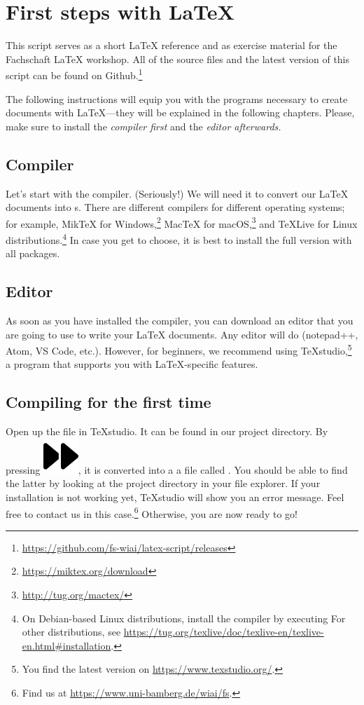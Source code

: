 \newpage
{}
\pagecolor{latexblue}

\chapter*{First steps with \LaTeX}

This script serves as a short \LaTeX{} reference and as exercise material for the Fachschaft  \LaTeX{} workshop.
All of the source files and the latest version of this script can be found on Github.\footnote{\url{https://github.com/fs-wiai/latex-script/releases}}

The following instructions will equip you with the programs necessary to create documents with \LaTeX{}---they will be explained in the following chapters.
Please, make sure to install the \emph{compiler first} and the \emph{editor afterwards}\textit{.}

\section*{Compiler}
Let’s start with the compiler.
(Seriously!)
We will need it to convert our \LaTeX{} documents into s.
There are different compilers for different operating systems;
for example, MikTeX for Windows,\footnote{\url{https://miktex.org/download}} Mac\TeX{} for macOS,\footnote{\url{http://tug.org/mactex/}} and \TeX{}Live for Linux distributions.\footnote{On Debian-based Linux distributions, install the compiler by executing 
For other distributions, see \url{https://tug.org/texlive/doc/texlive-en/texlive-en.html\#installation}.}
In case you get to choose, it is best to install the full version with all packages.

\section*{Editor}
As soon as you have installed the compiler, you can download an editor that you are going to use to write your \LaTeX{} documents.
Any editor will do (notepad++, Atom, VS Code, etc.).
However, for beginners, we recommend using \TeX{}studio,\footnote{You find the latest version on \url{https://www.texstudio.org/}.} a program that supports you with \LaTeX-specific features.

\section*{Compiling for the first time}
Open up the file  in \TeX{}studio. 
It can be found in our project directory.
By pressing \includegraphics[width=.8em]{graphics/faForward.png}, it is converted into a a file called .
You should be able to find the latter by looking at the project directory in your file explorer.
If your installation is not working yet, \TeX{}studio will show you an error message.
Feel free to contact us in this case.\footnote{Find us at \url{https://www.uni-bamberg.de/wiai/fs}.}
Otherwise, you are now ready to go!

\newpage
\nopagecolor
